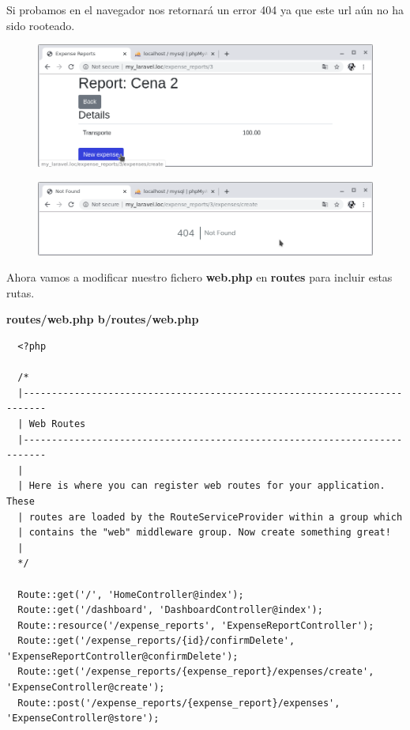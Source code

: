 \documentclass{article}
\begin{document}
Si probamos en el navegador nos retornará un error 404 ya que este url aún no
ha sido rooteado.

\newpage

\begin{figure}[h!]
  \centering
  \includegraphics[scale=0.5]{./Pictures/112_new_expense.png}
\end{figure}

\begin{figure}[h!]
  \centering
  \includegraphics[scale=0.5]{./Pictures/113_404_new_expense.png}
\end{figure}

Ahora vamos a modificar nuestro fichero \textbf{web.php} en \textbf{routes}
para incluir estas rutas.

\textbf{routes/web.php b/routes/web.php}
\begin{verbatim}
  <?php

  /*
  |--------------------------------------------------------------------------
  | Web Routes
  |--------------------------------------------------------------------------
  |
  | Here is where you can register web routes for your application. These
  | routes are loaded by the RouteServiceProvider within a group which
  | contains the "web" middleware group. Now create something great!
  |
  */

  Route::get('/', 'HomeController@index');
  Route::get('/dashboard', 'DashboardController@index');
  Route::resource('/expense_reports', 'ExpenseReportController');
  Route::get('/expense_reports/{id}/confirmDelete', 'ExpenseReportController@confirmDelete');
  Route::get('/expense_reports/{expense_report}/expenses/create', 'ExpenseController@create');
  Route::post('/expense_reports/{expense_report}/expenses', 'ExpenseController@store');
\end{verbatim}
\end{document}
